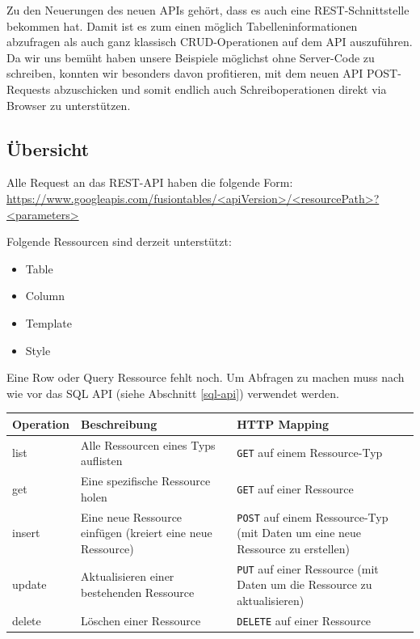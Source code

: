 Zu den Neuerungen des neuen APIs gehört, dass es auch eine REST-Schnittstelle\cite{rest} bekommen hat. Damit ist es zum einen möglich Tabelleninformationen abzufragen als auch ganz klassisch CRUD-Operationen auf dem API auszuführen. Da wir uns bemüht haben unsere Beispiele möglichst ohne Server-Code zu schreiben, konnten wir besonders davon profitieren, mit dem neuen API POST-Requests abzuschicken und somit endlich auch Schreiboperationen direkt via Browser zu unterstützen. 

\subsection{Übersicht}
Alle Request an das REST-API haben die folgende Form:
\url{https://www.googleapis.com/fusiontables/<apiVersion>/<resourcePath>?<parameters>}

Folgende Ressourcen sind derzeit unterstützt:
\begin{itemize}
	\item Table
	\item Column
	\item Template
	\item Style
\end{itemize}

Eine Row oder Query Ressource fehlt noch. Um Abfragen zu machen muss nach wie vor das SQL API (siehe Abschnitt \ref{sql-api}) verwendet werden.

\begin{longtable}{|l|p{6cm}|p{7.5cm}|}
\hline 
\textbf{Operation} & \textbf{Beschreibung} & \textbf{HTTP Mapping} \\ 
\hline 
list & Alle Ressourcen eines Typs auflisten & \texttt{GET} auf einem Ressource-Typ\\ 
\hline 
get	 & Eine spezifische Ressource holen	& \texttt{GET} auf einer Ressource\\
\hline 
insert & Eine neue Ressource einfügen (kreiert eine neue Ressource) & \texttt{POST} auf einem Ressource-Typ (mit Daten um eine neue Ressource zu erstellen)\\
\hline 
update & Aktualisieren einer bestehenden Ressource & \texttt{PUT} auf einer Ressource (mit Daten um die Ressource zu aktualisieren)\\
\hline 
delete & Löschen einer Ressource & \texttt{DELETE}  auf einer Ressource\\
\hline 
\end{longtable}

